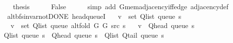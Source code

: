 \begin{isabellebody}
\ \ \isamarkupfalse%
\ {\isacharquery}{\kern0pt}thesis\isanewline
\ \ \ \ \isamarkupfalse%
\ False\isanewline
\ \ \ \ \isamarkupfalse%
\ {\isacharparenleft}{\kern0pt}simp\ add{\isacharcolon}{\kern0pt}\ G{}{\isachardot}{\kern0pt}mem{\isacharunderscore}{\kern0pt}adjacency{\isacharunderscore}{\kern0pt}iff{\isacharunderscore}{\kern0pt}edge\ adjacency{\isacharunderscore}{\kern0pt}def{\isacharparenright}{\kern0pt}\isanewline
{}\isamarkupfalse%
%
\endisatagproof
{\isafoldproof}%
%
\isadelimproof
\isanewline
%
\endisadelimproof
%
\isadeliminvisible
\isanewline
%
\endisadeliminvisible
%
\isataginvisible
{}\isamarkupfalse%
\ {\isacharparenleft}{\kern0pt}\ alt{\isacharunderscore}{\kern0pt}bfs{\isacharunderscore}{\kern0pt}invar{\isacharunderscore}{\kern0pt}not{\isacharunderscore}{\kern0pt}DONE{\isacharparenright}{\kern0pt}\ head{\isacharunderscore}{\kern0pt}queueI{\isacharunderscore}{\kern0pt}{}{\isacharcolon}{\kern0pt}\isanewline
\ \ \ {\isachardoublequoteopen}v\ {\isasymin}\ set\ {\isacharparenleft}{\kern0pt}Q{\isacharunderscore}{\kern0pt}list\ {\isacharparenleft}{\kern0pt}queue\ s{\isacharparenright}{\kern0pt}{\isacharparenright}{\kern0pt}{\isachardoublequoteclose}\isanewline
\ \ \ {\isachardoublequoteopen}v\ {\isasymnotin}\ set\ {\isacharparenleft}{\kern0pt}Q{\isacharunderscore}{\kern0pt}list\ {\isacharparenleft}{\kern0pt}queue\ {\isacharparenleft}{\kern0pt}alt{\isacharunderscore}{\kern0pt}fold\ G{}\ G{}\ src\ s{\isacharparenright}{\kern0pt}{\isacharparenright}{\kern0pt}{\isacharparenright}{\kern0pt}{\isachardoublequoteclose}\isanewline
\ \ \ {\isachardoublequoteopen}v\ {\isacharequal}{\kern0pt}\ Q{\isacharunderscore}{\kern0pt}head\ {\isacharparenleft}{\kern0pt}queue\ s{\isacharparenright}{\kern0pt}{\isachardoublequoteclose}%
\endisataginvisible
{\isafoldinvisible}%
%
\isadeliminvisible
\isanewline
%
\endisadeliminvisible
%
\isadelimproof
%
\endisadelimproof
%
\isatagproof
{}\isamarkupfalse%
\ {\isacharminus}{\kern0pt}\isanewline
\ \ \isamarkupfalse%
\ {\isachardoublequoteopen}Q{\isacharunderscore}{\kern0pt}list\ {\isacharparenleft}{\kern0pt}queue\ s{\isacharparenright}{\kern0pt}\ {\isacharequal}{\kern0pt}\ Q{\isacharunderscore}{\kern0pt}head\ {\isacharparenleft}{\kern0pt}queue\ s{\isacharparenright}{\kern0pt}\ {\isacharhash}{\kern0pt}\ Q{\isacharunderscore}{\kern0pt}list\ {\isacharparenleft}{\kern0pt}Q{\isacharunderscore}{\kern0pt}tail\ {\isacharparenleft}{\kern0pt}queue\ s{\isacharparenright}{\kern0pt}{\isacharparenright}{\kern0pt}{\isachardoublequoteclose}\isanewline

\end{isabellebody}
